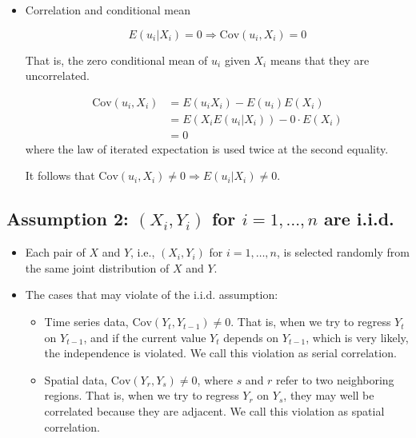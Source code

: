 \documentclass[a4paper,11pt]{article}
\begin{document}
\begin{itemize}
\item Correlation and conditional mean
\label{sec:orgeefb148}

\[ E(u_i | X_i) = 0 \Rightarrow \mathrm{Cov}(u_i, X_i) = 0 \]

That is, the zero conditional mean of \(u_i\) given \(X_i\) means that
they are uncorrelated.

\begin{equation*}
\begin{split}
\mathrm{Cov}(u_i, X_i) &= E(u_i X_i) - E(u_i) E(X_i) \\
&= E(X_i E(u_i|X_i)) - 0 \cdot E(X_i) \\
&= 0
\end{split}
\end{equation*}
where the law of iterated expectation is used twice at the second equality.

It follows that \(\mathrm{Cov}(u_i, X_i) \neq 0 \Rightarrow E(u_i|X_i) \neq 0\).
\end{itemize}


\subsection{Assumption 2: \((X_i, Y_i)\) for \(i = 1, \ldots, n\) are i.i.d.}
\label{sec:orgbb54907}

\begin{itemize}
\item Each pair of \(X\) and \(Y\), i.e., \((X_i, Y_i)\) for \(i=1, \ldots, n\), is
selected randomly from the same joint distribution of \(X\) and \(Y\).

\item The cases that may violate of the i.i.d. assumption:
\begin{itemize}
\item Time series data, \(\mathrm{Cov}(Y_t, Y_{t-1}) \neq 0\). That is, when
we try to regress \(Y_t\) on \(Y_{t-1}\), and if the current value
\(Y_t\) depends on \(Y_{t-1}\), which is very likely, the independence
is violated. We call this violation as serial correlation.
\item Spatial data, \(\mathrm{Cov}(Y_r, Y_s) \neq 0\), where \(s\) and \(r\)
refer to two neighboring regions. That is, when we try to regress
\(Y_r\) on \(Y_s\), they may well be correlated because they are
adjacent. We call this violation as spatial correlation.
\end{itemize}
\end{itemize}
\end{document}
